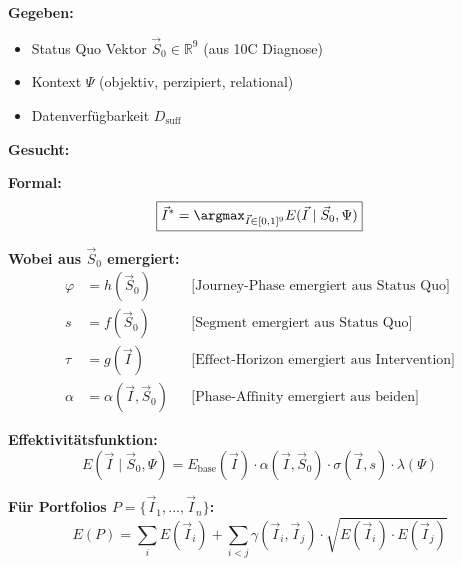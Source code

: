 \begin{tcolorbox}[colback=red!5!white, colframe=red!75!black,
    title=\textbf{Central Question (Grundfrage)}]

\textbf{Gegeben:}
\begin{itemize}[nosep]
    \item Status Quo Vektor $\vec{S}_0 \in \mathbb{R}^9$ (aus 10C Diagnose)
    \item Kontext $\Psi$ (objektiv, perzipiert, relational)
    \item Datenverfügbarkeit $D_{\text{suff}}$
\end{itemize}

\textbf{Gesucht:}

\begin{center}
\end{center}

\textbf{Formal:}
\begin{equation}
\boxed{\vec{I}^* = \argmax_{\vec{I} \in [0,1]^9} E(\vec{I} \mid \vec{S}_0, \Psi)}
\end{equation}

\textbf{Wobei aus $\vec{S}_0$ emergiert:}
\begin{align}
\varphi &= h(\vec{S}_0) && \text{[Journey-Phase emergiert aus Status Quo]} \\
s &= f(\vec{S}_0) && \text{[Segment emergiert aus Status Quo]} \\
\tau &= g(\vec{I}) && \text{[Effect-Horizon emergiert aus Intervention]} \\
\alpha &= \alpha(\vec{I}, \vec{S}_0) && \text{[Phase-Affinity emergiert aus beiden]}
\end{align}

\textbf{Effektivitätsfunktion:}
\begin{equation}
E(\vec{I} \mid \vec{S}_0, \Psi) = E_{\text{base}}(\vec{I}) \cdot \alpha(\vec{I}, \vec{S}_0) \cdot \sigma(\vec{I}, s) \cdot \lambda(\Psi)
\end{equation}

\textbf{Für Portfolios $P = \{\vec{I}_1, ..., \vec{I}_n\}$:}
\begin{equation}
E(P) = \sum_{i} E(\vec{I}_i) + \sum_{i < j} \gamma(\vec{I}_i, \vec{I}_j) \cdot \sqrt{E(\vec{I}_i) \cdot E(\vec{I}_j)}
\end{equation}


\end{tcolorbox}
